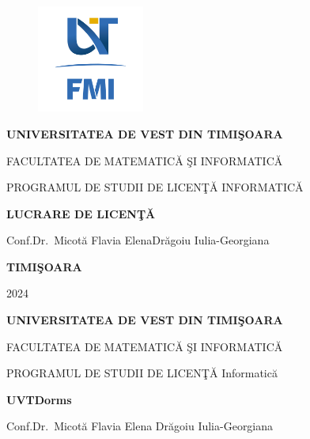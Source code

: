 \documentclass[12pt,a4paper]{report}
\theoremstyle{definition}
\theoremstyle{remark}
\begin{document}
\thispagestyle{empty}
\begin{center}
    \begin{figure}[H]
        \vspace{-20pt}
        \begin{center}
            \includegraphics[width=100pt]{resurse/FMI-03.png}
        \end{center}
    \end{figure}


    {\large{\bf UNIVERSITATEA DE VEST DIN TIMI\c SOARA

        FACULTATEA DE MATEMATIC\u A \c SI INFORMATIC\u A

        PROGRAMUL DE STUDII DE LICEN\c T\u A INFORMATICĂ  }}

    \vspace{120pt}
    {\huge {\bf LUCRARE DE LICEN\c T\u A}}

    \vspace{150pt}
\end{center}

{\large{}

\noindent Conf.Dr.\ Micotă Flavia Elena\hfill Dr\u agoiu  Iulia-Georgiana}

\vfill
\begin{center}
    {\bf TIMI\c SOARA

        2024}
\end{center}
\newpage
\thispagestyle{empty}
\begin{center}
    {\large{\bf UNIVERSITATEA DE VEST DIN TIMI\c SOARA

            FACULTATEA DE MATEMATIC\u A \c SI INFORMATIC\u A


            PROGRAMUL DE STUDII DE LICEN\c T\u A  Informatic\u a  }}

    \vspace{120pt}
    {\huge {\bf UVTDorms}}

    \vspace{150pt}
\end{center}

{\large{}

\noindent Conf.Dr.\ Micot\u a Flavia Elena \hfill Dr\u agoiu Iulia-Georgiana}
\end{document}
